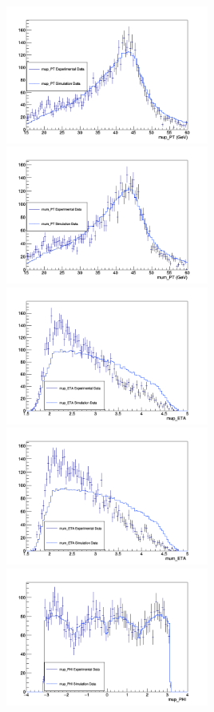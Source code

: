 \documentclass[a4paper]{article}
\begin{document}
\includegraphics[clip, trim = 0.5cm 0cm 1.7cm 1.3cm, width=0.5\textwidth]{Measurement_mup_PT.png}
\includegraphics[clip, trim = 0.5cm 0cm 1.7cm 1.3cm, width=0.5\textwidth]{Measurement_mum_PT.png}
\includegraphics[clip, trim = 0.5cm 0cm 1.7cm 1.3cm, width=0.5\textwidth]{Measurement_mup_ETA.png}
\includegraphics[clip, trim = 0.5cm 0cm 1.7cm 1.3cm, width=0.5\textwidth]{Measurement_mum_ETA.png}
\includegraphics[clip, trim = 0.5cm 0cm 1.7cm 1.3cm, width=0.5\textwidth]{Measurement_mup_PHI.png}
\end{document}
